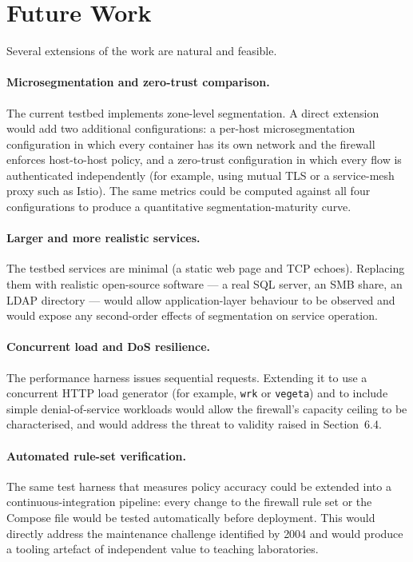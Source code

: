 \section{Future Work}

Several extensions of the work are natural and feasible.

\paragraph{Microsegmentation and zero-trust comparison.} The current testbed implements zone-level segmentation. A direct extension would add two additional configurations: a per-host microsegmentation configuration in which every container has its own network and the firewall enforces host-to-host policy, and a zero-trust configuration in which every flow is authenticated independently (for example, using mutual TLS or a service-mesh proxy such as Istio). The same metrics could be computed against all four configurations to produce a quantitative segmentation-maturity curve.

\paragraph{Larger and more realistic services.} The testbed services are minimal (a static web page and TCP echoes). Replacing them with realistic open-source software --- a real SQL server, an SMB share, an LDAP directory --- would allow application-layer behaviour to be observed and would expose any second-order effects of segmentation on service operation.

\paragraph{Concurrent load and DoS resilience.} The performance harness issues sequential requests. Extending it to use a concurrent HTTP load generator (for example, \texttt{wrk} or \texttt{vegeta}) and to include simple denial-of-service workloads would allow the firewall's capacity ceiling to be characterised, and would address the threat to validity raised in Section~6.4.

\paragraph{Automated rule-set verification.} The same test harness that measures policy accuracy could be extended into a continuous-integration pipeline: every change to the firewall rule set or the Compose file would be tested automatically before deployment. This would directly address the maintenance challenge identified by \textcite{Wool}{2004} and would produce a tooling artefact of independent value to teaching laboratories.

